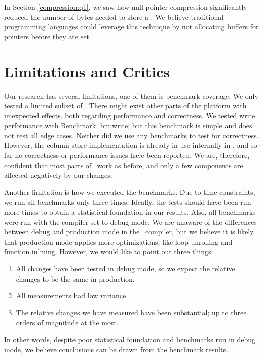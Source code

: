 In Section \ref{compression:q1}, we saw how null pointer compression significantly reduced the number of bytes needed to store a . We believe traditional programming languages could leverage this technique by not allocating buffers for pointers before they are set.

\section{Limitations and Critics}
\label{sec:Limitations and Critics}
Our research has several limitations, one of them is benchmark coverage. We only tested a limited subset of \gap. There might exist other parts of the platform with unexpected effects, both regarding performance and correctness. We tested write performance with Benchmark \ref{bm:write} but this benchmark is simple and does not test all edge cases. Neither did we use any benchmarks to test for correctness. However, the column store implementation is already in use internally in \genus, and so far no correctness or performance issues have been reported. We are, therefore, confident that most parts of \gap~work as before, and only a few components are affected negatively by our changes.

Another limitation is how we executed the benchmarks. Due to time constraints, we run all benchmarks only three times. Ideally, the tests should have been run more times to obtain a statistical foundation in our results. Also, all benchmarks were run with the compiler set to debug mode. We are unaware of the differences between debug and production mode in the \delphi~compiler, but we believe it is likely that production mode applies more optimizations, like loop unrolling and function inlining. However, we would like to point out three things: 

\begin{enumerate}
    \item All changes have been tested in debug mode, so we expect the relative changes to be the same in production.
    \item All measurements had low variance.
    \item The relative changes we have measured have been substantial; up to three orders of magnitude at the most.
\end{enumerate}

In other words, despite poor statistical foundation and benchmarks run in debug mode, we believe conclusions can be drawn from the benchmark results.

